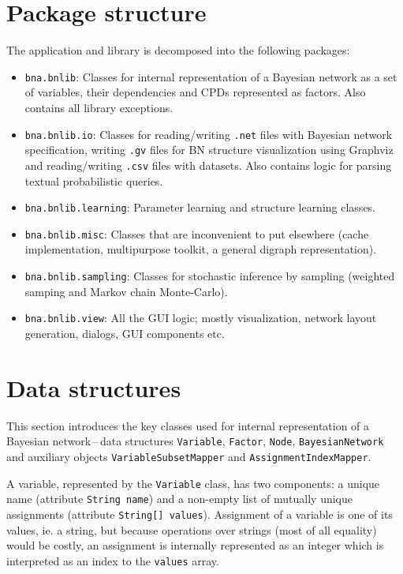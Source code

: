 \documentclass[english,cover]{fitthesis} %
\newcommand{\srccode}[1]{{\tt #1}}         %
\begin{document}
\section{Package structure}
The application and library is decomposed into the following packages:
\begin{itemize}
    \item \srccode{bna.bnlib}: Classes for internal representation of a Bayesian network as a set of variables, their dependencies and CPDs represented as factors. Also contains all library exceptions.
    \item \srccode{bna.bnlib.io}: Classes for reading/writing \srccode{.net} files with Bayesian network specification, writing \srccode{.gv} files for BN structure visualization using Graphviz and reading/writing \srccode{.csv} files with datasets. Also contains logic for parsing textual probabilistic queries. 
    \item \srccode{bna.bnlib.learning}: Parameter learning and structure learning classes.
    \item \srccode{bna.bnlib.misc}: Classes that are inconvenient to put elsewhere (cache implementation, multipurpose toolkit, a general digraph representation).
    \item \srccode{bna.bnlib.sampling}: Classes for stochastic inference by sampling (weighted samping and Markov chain Monte-Carlo).
    \item \srccode{bna.bnlib.view}: All the GUI logic; mostly visualization, network layout generation, dialogs, GUI components etc.
\end{itemize}




\section{Data structures}\label{ch:implementation-data_structures}
This section introduces the key classes used for internal representation of a Bayesian network\,--\,data structures \srccode{Variable}, \srccode{Factor}, \srccode{Node}, \srccode{BayesianNetwork} and auxiliary objects \srccode{VariableSubsetMapper} and \srccode{AssignmentIndexMapper}.

A variable, represented by the \srccode{Variable} class, has two components: a unique name (attribute \srccode{String name}) and a non-empty list of mutually unique assignments (attribute \srccode{String[] values}). Assignment of a variable is one of its values, ie. a string, but because operations over strings (most of all equality) would be costly, an assignment is internally represented as an integer which is interpreted as an index to the \srccode{values} array.
\end{document}
